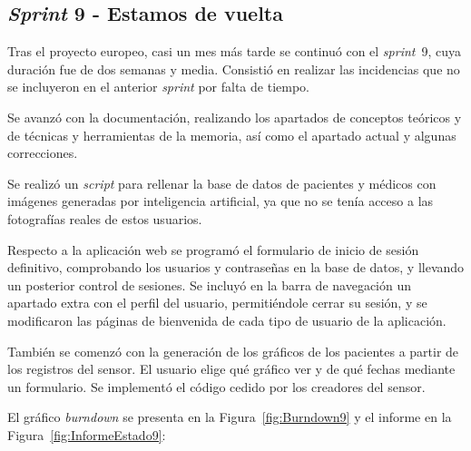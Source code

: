\subsection{\textit{Sprint} 9 - Estamos de vuelta}
Tras el proyecto europeo, casi un mes más tarde se continuó con el \textit{sprint}~9, cuya duración fue de dos semanas y media. Consistió en realizar las incidencias que no se incluyeron en el anterior \textit{sprint} por falta de tiempo.

Se avanzó con la documentación, realizando los apartados de conceptos teóricos y de técnicas y herramientas de la memoria, así como el apartado actual y algunas correcciones.

Se realizó un \textit{script} para rellenar la base de datos de pacientes y médicos con imágenes generadas por inteligencia artificial, ya que no se tenía acceso a las fotografías reales de estos usuarios.

Respecto a la aplicación web se programó el formulario de inicio de sesión definitivo, comprobando los usuarios y contraseñas en la base de datos, y llevando un posterior control de sesiones. Se incluyó en la barra de navegación un apartado extra con el perfil del usuario, permitiéndole cerrar su sesión, y se modificaron las páginas de bienvenida de cada tipo de usuario de la aplicación.

También se comenzó con la generación de los gráficos de los pacientes a partir de los registros del sensor. El usuario elige qué gráfico ver y de qué fechas mediante un formulario. Se implementó el código cedido por los creadores del sensor.

El gráfico \textit{burndown} se presenta en la Figura~\ref{fig:Burndown9} y el informe en la Figura~\ref{fig:InformeEstado9}:




